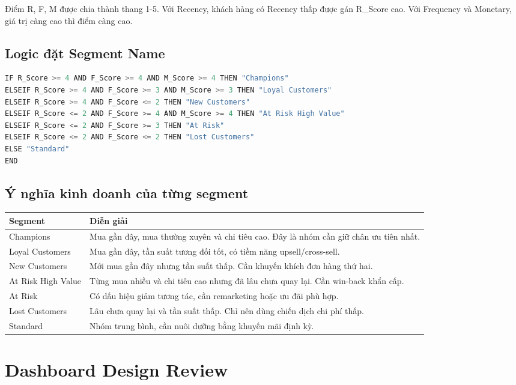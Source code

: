 \documentclass[11pt,a4paper]{article}
\begin{document}
Điểm R, F, M được chia thành thang 1-5. Với Recency, khách hàng có Recency thấp được gán R\_Score cao. Với Frequency và Monetary, giá trị càng cao thì điểm càng cao.

\subsection{Logic đặt Segment Name}

\begin{lstlisting}[language=Python]
IF R_Score >= 4 AND F_Score >= 4 AND M_Score >= 4 THEN "Champions"
ELSEIF R_Score >= 4 AND F_Score >= 3 AND M_Score >= 3 THEN "Loyal Customers"
ELSEIF R_Score >= 4 AND F_Score <= 2 THEN "New Customers"
ELSEIF R_Score <= 2 AND F_Score >= 4 AND M_Score >= 4 THEN "At Risk High Value"
ELSEIF R_Score <= 2 AND F_Score >= 3 THEN "At Risk"
ELSEIF R_Score <= 2 AND F_Score <= 2 THEN "Lost Customers"
ELSE "Standard"
END
\end{lstlisting}

\subsection{Ý nghĩa kinh doanh của từng segment}

\begin{tabularx}{\textwidth}{p{3.6cm}X}
\toprule
\textbf{Segment} & \textbf{Diễn giải} \\
\midrule
Champions & Mua gần đây, mua thường xuyên và chi tiêu cao. Đây là nhóm cần giữ chân ưu tiên nhất. \\
Loyal Customers & Mua gần đây, tần suất tương đối tốt, có tiềm năng upsell/cross-sell. \\
New Customers & Mới mua gần đây nhưng tần suất thấp. Cần khuyến khích đơn hàng thứ hai. \\
At Risk High Value & Từng mua nhiều và chi tiêu cao nhưng đã lâu chưa quay lại. Cần win-back khẩn cấp. \\
At Risk & Có dấu hiệu giảm tương tác, cần remarketing hoặc ưu đãi phù hợp. \\
Lost Customers & Lâu chưa quay lại và tần suất thấp. Chỉ nên dùng chiến dịch chi phí thấp. \\
Standard & Nhóm trung bình, cần nuôi dưỡng bằng khuyến mãi định kỳ. \\
\bottomrule
\end{tabularx}

\section{Dashboard Design Review}
\end{document}
